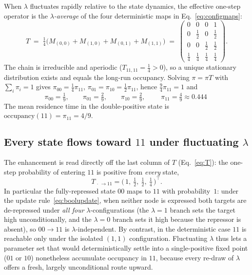 \documentclass[11pt]{article}
\providecommand{\DIFaddtex}[1]{{\protect\color{red}#1}} %
\providecommand{\DIFdeltex}[1]{} %
\providecommand{\DIFaddbegin}{} %
\providecommand{\DIFaddend}{} %
\providecommand{\DIFdelbegin}{} %
\providecommand{\DIFdelend}{} %
\providecommand{\DIFadd}[1]{\texorpdfstring{\DIFaddtex{#1}}{#1}} %
\providecommand{\DIFdel}[1]{\texorpdfstring{\DIFdeltex{#1}}{}} %
\providecommand{\DIFaddincludegraphics}[2][]{\DIFOincludegraphics[#1]{#2}} %
\providecommand{\DIFdelincludegraphics}[2][]{}
\DeclareRobustCommand{\DIFaddbegin}{\DIFOaddbegin \let\includegraphics\DIFaddincludegraphics} %
\DeclareRobustCommand{\DIFaddend}{\DIFOaddend \let\includegraphics\DIFOincludegraphics} %
\DeclareRobustCommand{\DIFdelbegin}{\DIFOdelbegin \let\includegraphics\DIFdelincludegraphics} %
\DeclareRobustCommand{\DIFdelend}{\DIFOaddend \let\includegraphics\DIFOincludegraphics} %
\begin{document}
When $\lambda$ fluctuates rapidly relative to the state dynamics, the effective
one-step operator is the \emph{$\lambda$-average} of the four deterministic maps
in Eq.~\eqref{eq:configmaps}:
\begin{equation}
  T \;=\; \tfrac{1}{4}\bigl(M_{(0,0)}+M_{(1,0)}+M_{(0,1)}+M_{(1,1)}\bigr)
    \;=\;
    \begin{pmatrix}
      0 & 0 & 0 & 1\\[2pt]
      0 & \tfrac{1}{2} & 0 & \tfrac{1}{2}\\[2pt]
      0 & 0 & \tfrac{1}{2} & \tfrac{1}{2}\\[2pt]
      \tfrac{1}{4} & \tfrac{1}{4} & \tfrac{1}{4} & \tfrac{1}{4}
    \end{pmatrix}.
  \label{eq:T}
\end{equation}
The chain is irreducible and aperiodic ($T_{11,11}=\tfrac14>0$), so a unique
stationary distribution exists and equals the long-run occupancy. Solving
$\pi=\pi T$ with $\sum_i\pi_i=1$ gives $\pi_{00}=\tfrac14\pi_{11}$,
$\pi_{01}=\pi_{10}=\tfrac12\pi_{11}$, hence $\tfrac{9}{4}\pi_{11}=1$ and
\begin{equation}
  \pi_{00}=\tfrac{1}{9},\qquad
  \pi_{01}=\tfrac{2}{9},\qquad
  \pi_{10}=\tfrac{2}{9},\qquad
  \boxed{\;\pi_{11}=\tfrac{4}{9}\approx 0.444\;}
  \label{eq:piann}
\end{equation}
The mean residence time in the double-positive state is
\DIFdelbegin \DIFdel{$\mathrm{MRT}(11)=\pi_{11}=4/9$}\DIFdelend \DIFaddbegin \DIFadd{$\mathrm{occupancy}(11)=\pi_{11}=4/9$}\DIFaddend .

\subsection{Every state flows toward $11$ under fluctuating $\lambda$}
\label{sec:column}

The enhancement is read directly off the last column of $T$
(Eq.~\eqref{eq:T}): the one-step probability of entering $11$ is positive from
\emph{every} state,
\begin{equation}
  T_{\,\cdot\,\to 11} = \bigl(\,1,\ \tfrac12,\ \tfrac12,\ \tfrac14\,\bigr)^{\!\top}.
\end{equation}
In particular the fully-repressed state $00$ maps to $11$ with probability~$1$:
under the update rule~\eqref{eq:boolupdate}, when neither node is expressed both
targets are de-repressed under \emph{all four} $\lambda$-configurations (the
$\lambda=1$ branch sets the target high unconditionally, and the $\lambda=0$
branch sets it high because the repressor is absent), so $00\!\to\!11$ is
$\lambda$-independent. By contrast, in the deterministic case $11$ is reachable
only under the isolated $(1,1)$ configuration. Fluctuating $\lambda$ thus lets a
parameter set that would deterministically settle into a single-positive fixed
point ($01$ or $10$) nonetheless accumulate occupancy in $11$, because every
re-draw of $\lambda$ offers a fresh, largely unconditional route upward.
\end{document}
